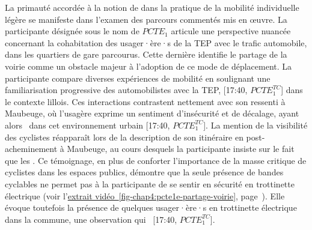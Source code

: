 \begin{refsegment}
La primauté accordée à la notion de  dans la pratique de la mobilité individuelle légère se manifeste dans l'examen des parcours commentés mis en œuvre. La participante désignée sous le nom de \(PCTE_{1}\) articule une perspective nuancée concernant la cohabitation des usager·ère·s de la \acrshort{TEP} avec le trafic automobile, dans les quartiers de gare parcourus. Cette dernière identifie le partage de la voirie comme un obstacle majeur à l'adoption de ce mode de déplacement. La participante compare diverses expériences de mobilité en soulignant une familiarisation progressive des automobilistes avec la \acrshort{TEP},  [17:40, \(PCTE^{TC}_{1}\)] dans le contexte lillois. Ces interactions contrastent nettement avec son ressenti à Maubeuge, où l'usagère exprime un sentiment d'insécurité et de décalage, ayant alors ~dans cet environnement urbain [17:40, \(PCTE^{TC}_{1}\)]. La mention de la visibilité des cyclistes réapparaît lors de la description de son itinéraire en post-acheminement à Maubeuge, au cours desquels la participante insiste sur le fait que les . Ce témoignage, en plus de conforter l'importance de la masse critique de cyclistes dans les espaces publics, démontre que la seule présence de bandes cyclables ne permet pas à la participante de se sentir en sécurité en trottinette électrique (voir l'\hyperref[fig-chap4:pcte1e-partage-voirie]{extrait vidéo~\ref{fig-chap4:pcte1e-partage-voirie}}, page~\pageref{fig-chap4:pcte1e-partage-voirie}). Elle évoque toutefois la présence de quelques usager·ère·s en trottinette électrique dans la commune, une observation qui ~[17:40, \(PCTE^{TC}_{1}\)].%


\end{refsegment}
